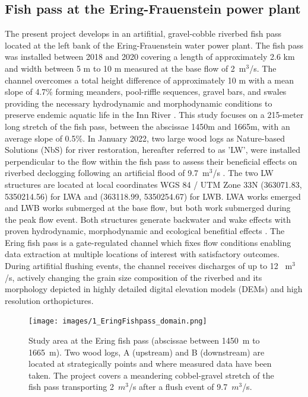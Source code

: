 \documentclass[draft,linenumbers,onecolumn]{agujournal2019} %
\begin{document}
\subsection{Fish pass at the Ering-Frauenstein power plant}
\label{subsec:Sec2.1 }
The present project develops in an artifitial, gravel-cobble riverbed fish pass located at the left bank of the Ering-Frauenstein water power plant. The fish pass was installed between 2018 and 2020 covering a length of approximately 2.6 km  and width between 5 m to 10 m measured at the base flow of  2~m$^3$/s. The channel overcomes a total height difference of approximately 10 m with a mean slope of 4.7\% forming meanders, pool-riffle sequences, gravel bars, and swales providing the necessary hydrodynamic and morphodynamic conditions to preserve endemic aquatic life in the Inn River \cite{schwindt2023fuzzylogic,zauner2020wie}. This study focuses on a 215-meter long stretch of the fish pass, between the abscissae 1450m and 1665m, with an average slope of 0.5\%. In January 2022, two large wood logs as Nature-based Solutions (NbS) for river restoration, hereafter referred to as 'LW', were installed perpendicular to the flow within the fish pass to assess their beneficial effects on riverbed declogging following an artificial flood of 9.7~m$^3$/s  \cite{schwindt2023fuzzylogic}. The two LW structures are located at local coordinates WGS 84 / UTM Zone 33N (363071.83, 5350214.56) for LWA and (363118.99, 5350254.67) for LWB. LWA works emerged and LWB works submerged at the base flow, but both work submerged during the peak flow event. Both structures generate backwater and wake effects with proven  hydrodynamic, morphodynamic and ecological benefitial effects \cite{schalko2021flow,schwindt2023fuzzylogic}.    
The Ering fish pass is a gate-regulated channel which fixes flow conditions enabling data extraction at multiple locations of interest with satisfactory outcomes. During artifitial flushing events, the channel receives discharges of up to 12 ~m$^3$/s, actively changing the grain size composition of the riverbed and its morphology depicted in highly detailed digital elevation models (DEMs) and high resolution orthopictures.


\begin{figure}[htbp]
	\centering
	\texttt{[image: images/1\_EringFishpass\_domain.png]}
	\caption{Study area  at the Ering fish pass (abscissae between 1450~m to 1665~m). Two wood logs, A (upstream) and B (downstream) are located at strategically points and where measured data have been taken. The project covers a meandering cobbel-gravel stretch of the fish pass transporting 2~$m^3$/s after a flush event of 9.7~$m^3$/s.   
	}
	\label{fig:StudyArea}
\end{figure}
\end{document}
